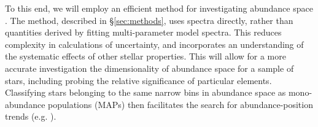 \documentclass[preprint]{aastex}
\begin{document}
To this end, we will employ an efficient method for investigating abundance space \citep{openclusters}. The method, described in \S\ref{sec:methods}, uses spectra directly, rather than quantities derived by fitting multi-parameter model spectra. This reduces complexity in calculations of uncertainty, and incorporates an understanding of the systematic effects of other stellar properties. This will allow for a more accurate investigation the dimensionality of abundance space for a sample of stars, including probing the relative significance of particular elements. Classifying stars belonging to the same narrow bins in abundance space as mono-abundance populations (MAPs) then facilitates the search for abundance-position trends (e.g. \citealt{bovy2015}).

 



\end{document}
